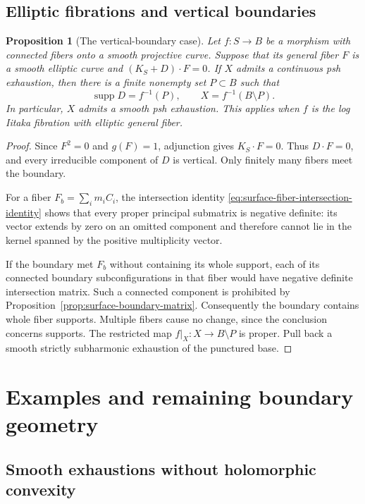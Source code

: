 \documentclass[11pt]{amsart}
\newtheorem{proposition}[theorem]{Proposition}
\theoremstyle{definition}
\theoremstyle{remark}
\numberwithin{equation}{section}
\newcommand{\supp}{\operatorname{supp}}
\begin{document}
\subsection{Elliptic fibrations and vertical boundaries}

\begin{proposition}[The vertical-boundary case]
\label{prop:surface-elliptic-iitaka}
Let $f:S\to B$ be a morphism with connected fibers onto a smooth
projective curve.  Suppose that its general fiber $F$ is a smooth
elliptic curve and $(K_S+D)\cdot F=0$.  If $X$ admits a continuous
psh exhaustion, then there is a finite nonempty set $P\subset B$ such
that
\[
 \supp D=f^{-1}(P),\qquad X=f^{-1}(B\setminus P).
\]
In particular, $X$ admits a smooth psh exhaustion.  This applies when
$f$ is the log Iitaka fibration with elliptic general fiber.
\end{proposition}

\begin{proof}
Since $F^2=0$ and $g(F)=1$, adjunction gives $K_S\cdot F=0$.
Thus $D\cdot F=0$, and every irreducible component of $D$ is
vertical.  Only finitely many fibers meet the boundary.

For a fiber $F_b=\sum_i m_iC_i$, the intersection identity
\eqref{eq:surface-fiber-intersection-identity} shows that every proper
principal submatrix is negative definite: its vector extends by zero
on an omitted component and therefore cannot lie in the kernel spanned
by the positive multiplicity vector.

If the boundary met $F_b$ without containing its whole support, each
of its connected boundary subconfigurations in that fiber would have
negative definite intersection matrix.  Such a connected component
is prohibited by Proposition~\ref{prop:surface-boundary-matrix}.
Consequently the boundary contains whole fiber supports.  Multiple
fibers cause no change, since the conclusion concerns supports.
The restricted map $f|_X:X\to B\setminus P$ is proper.  Pull back a
smooth strictly subharmonic exhaustion of the punctured base.
\end{proof}

\section{Examples and remaining boundary geometry}\label{sec:surface-examples}

\subsection{Smooth exhaustions without holomorphic convexity}
\end{document}

